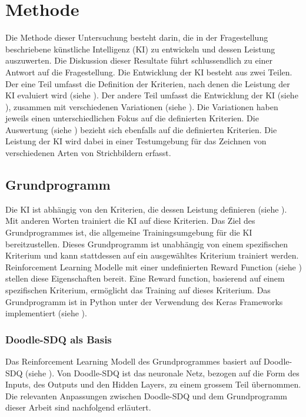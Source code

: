 \chapter{Methode}\label{chap:m}
Die Methode dieser Untersuchung besteht darin, die in der Fragestellung
beschriebene künstliche Intelligenz (KI) zu entwickeln und dessen Leistung
auszuwerten. Die Diskussion dieser Resultate führt schlussendlich zu einer
Antwort auf die Fragestellung. Die Entwicklung der KI besteht aus zwei Teilen.
Der eine Teil umfasst die Definition der Kriterien, nach denen die Leistung der
KI evaluiert wird (siehe ). Der andere Teil umfasst die
Entwicklung der KI (siehe ), zusammen mit verschiedenen
Variationen (siehe ). Die Variationen haben jeweils einen
unterschiedlichen Fokus auf die definierten Kriterien. Die Auswertung (siehe
) bezieht sich ebenfalls auf die definierten Kriterien.
Die Leistung der KI wird dabei in einer Testumgebung für das Zeichnen von
verschiedenen Arten von Strichbildern erfasst.

\section{Grundprogramm}\label{chap:m_grund}
Die KI ist abhängig von den Kriterien, die dessen Leistung definieren (siehe
). Mit anderen Worten trainiert die KI auf diese Kriterien.
Das Ziel des Grundprogrammes ist, die allgemeine Trainingsumgebung für die KI
bereitzustellen. Dieses Grundprogramm ist unabhängig von einem spezifischen
Kriterium und kann stattdessen auf ein ausgewähltes Kriterium trainiert werden.
Reinforcement Learning Modelle mit einer undefinierten Reward Function (siehe
) stellen diese Eigenschaften bereit. Eine Reward
function, basierend auf einem spezifischen Kriterium, ermöglicht das Training
auf dieses Kriterium. Das Grundprogramm ist in Python unter der Verwendung des
Keras Frameworks implementiert (siehe ). 

\subsection{Doodle-SDQ als Basis}\label{sub:m_grund_dood}
Das Reinforcement Learning Modell des Grundprogrammes basiert auf Doodle-SDQ
(siehe ). Von Doodle-SDQ ist das neuronale Netz, bezogen
auf die Form des Inputs, des Outputs und den Hidden Layers, zu einem grossem Teil
übernommen. Die relevanten Anpassungen zwischen Doodle-SDQ und dem Grundprogramm
dieser Arbeit sind nachfolgend erläutert.

